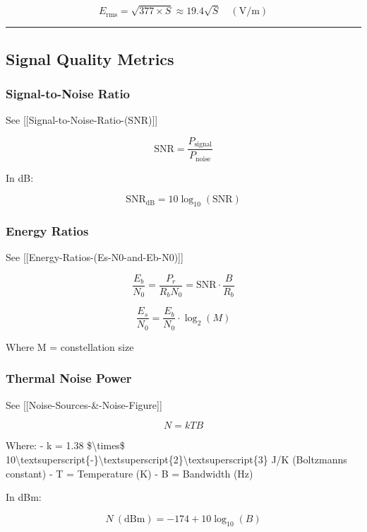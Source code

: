 \[
E_{\text{rms}} = \sqrt{377 \times S} \approx 19.4\sqrt{S} \quad (\text{V/m})
\]

\begin{center}\rule{0.5\linewidth}{0.5pt}\end{center}

\subsection{\texorpdfstring{ Signal Quality
Metrics}{ Signal Quality Metrics}}\label{signal-quality-metrics}

\subsubsection{Signal-to-Noise Ratio}\label{signal-to-noise-ratio}

See {[}{[}Signal-to-Noise-Ratio-(SNR){]}{]}

\[
\text{SNR} = \frac{P_{\text{signal}}}{P_{\text{noise}}}
\]

In dB:

\[
\text{SNR}_{\text{dB}} = 10\log_{10}(\text{SNR})
\]

\subsubsection{Energy Ratios}\label{energy-ratios}

See {[}{[}Energy-Ratios-(Es-N0-and-Eb-N0){]}{]}

\[
\frac{E_b}{N_0} = \frac{P_r}{R_b N_0} = \text{SNR} \cdot \frac{B}{R_b}
\]

\[
\frac{E_s}{N_0} = \frac{E_b}{N_0} \cdot \log_2(M)
\]

Where M = constellation size

\subsubsection{Thermal Noise Power}\label{thermal-noise-power}

See {[}{[}Noise-Sources-\&-Noise-Figure{]}{]}

\[
N = kTB
\]

Where: - k = 1.38 \$\textbackslash times\$
10\textbackslash textsuperscript\{-\}\textbackslash textsuperscript\{2\}\textbackslash textsuperscript\{3\}
J/K (Boltzmann\textquotesingle s constant) - T = Temperature (K) - B =
Bandwidth (Hz)

In dBm:

\[
N\ (\text{dBm}) = -174 + 10\log_{10}(B)
\]

